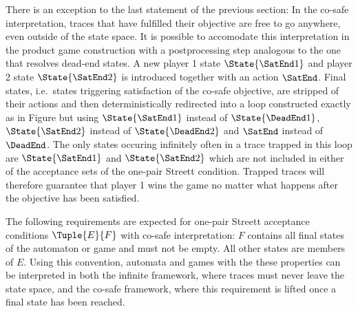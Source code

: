 \stopsubsection


\startsubsection[title={Co-safe Interpretation}]

    There is an exception to the last statement of the previous section:
    In the co-safe interpretation, traces that have fulfilled their objective are free to go anywhere, even outside of the state space.
    It is possible to accomodate this interpretation in the product game construction with a postprocessing step analogous to the one that resolves dead-end states.
    A new player 1 state $\State{\SatEnd1}$ and player 2 state $\State{\SatEnd2}$ is introduced together with an action $\SatEnd$.
    Final states, i.e.\ states triggering satisfaction of the co-safe objective, are stripped of their actions and then deterministically redirected into a loop constructed exactly as in Figure  but using $\State{\SatEnd1}$ instead of $\State{\DeadEnd1}$, $\State{\SatEnd2}$ instead of $\State{\DeadEnd2}$ and $\SatEnd$ instead of $\DeadEnd$.
    The only states occuring infinitely often in a trace trapped in this loop are $\State{\SatEnd1}$ and $\State{\SatEnd2}$ which are not included in either of the acceptance sets of the one-pair Streett condition.
    Trapped traces will therefore guarantee that player 1 wins the game no matter what happens after the objective has been satisfied.

    The following requirements are expected for one-pair Streett acceptance conditions $\Tuple{E}{F}$ with co-safe interpretation:
    $F$ contains all final states of the automaton or game and must not be empty.
    All other states are members of $E$.
    Using this convention, automata and games with the these properties can be interpreted in both the infinite framework, where traces must never leave the state space, and the co-safe framework, where this requirement is lifted once a final state has been reached.

\stopsubsection


